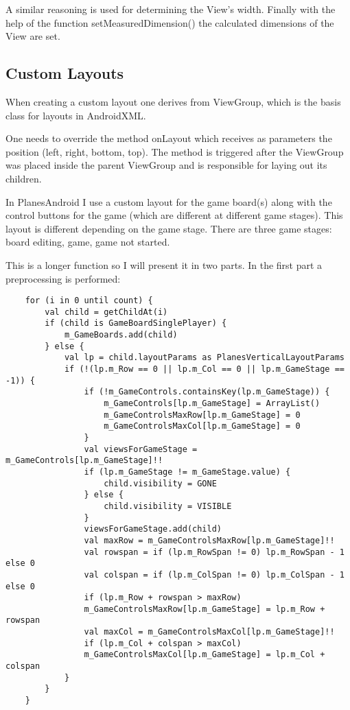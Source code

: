 A similar reasoning is used for determining the View's width. Finally with the help of the function setMeasuredDimension() the calculated dimensions of the View are set.

\subsection {Custom Layouts}

When creating a custom layout one derives from ViewGroup, which is the basis class for layouts in AndroidXML.

One needs to override the method onLayout which receives as parameters the position (left, right, bottom, top). The method is triggered after the ViewGroup was placed inside the parent ViewGroup and is responsible for laying out its children.

In PlanesAndroid I use a custom layout for the game board(s) along with the control buttons for the game (which are different at different game stages). This layout is different depending on the game stage. There are three game stages: board editing, game, game not started.

This is a longer function so I will present it in two parts. In the first part a preprocessing is performed:

\begin{lstlisting}
	for (i in 0 until count) {
		val child = getChildAt(i)
		if (child is GameBoardSinglePlayer) {
			m_GameBoards.add(child)
		} else {
			val lp = child.layoutParams as PlanesVerticalLayoutParams
			if (!(lp.m_Row == 0 || lp.m_Col == 0 || lp.m_GameStage == -1)) {
				if (!m_GameControls.containsKey(lp.m_GameStage)) {
					m_GameControls[lp.m_GameStage] = ArrayList()
					m_GameControlsMaxRow[lp.m_GameStage] = 0
					m_GameControlsMaxCol[lp.m_GameStage] = 0
				}
				val viewsForGameStage = m_GameControls[lp.m_GameStage]!!
				if (lp.m_GameStage != m_GameStage.value) {
					child.visibility = GONE
				} else {
					child.visibility = VISIBLE
				}
				viewsForGameStage.add(child)
				val maxRow = m_GameControlsMaxRow[lp.m_GameStage]!!
				val rowspan = if (lp.m_RowSpan != 0) lp.m_RowSpan - 1 else 0
				val colspan = if (lp.m_ColSpan != 0) lp.m_ColSpan - 1 else 0
				if (lp.m_Row + rowspan > maxRow)
				m_GameControlsMaxRow[lp.m_GameStage] = lp.m_Row + rowspan
				val maxCol = m_GameControlsMaxCol[lp.m_GameStage]!!
				if (lp.m_Col + colspan > maxCol)
				m_GameControlsMaxCol[lp.m_GameStage] = lp.m_Col + colspan
			}
		}
	}
\end{lstlisting}


